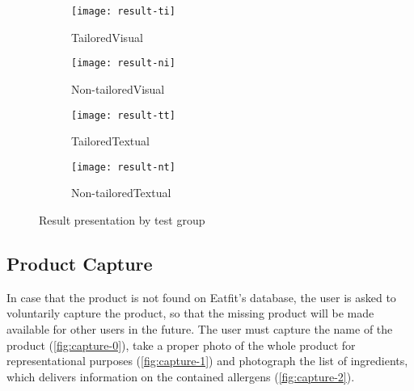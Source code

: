 \begin{figure}[H]
     \centering
     \begin{subfigure}[b]{0.2\textwidth}
         \centering
         \texttt{[image: result-ti]}
         \caption{Tailored\linebreak Visual}
         \label{fig:result-ti}
     \end{subfigure}
          \hfill
     \begin{subfigure}[b]{0.2\textwidth}
         \centering
         \texttt{[image: result-ni]}
         \caption{Non-tailored\linebreak Visual}
         \label{fig:result-ni}
     \end{subfigure}
          \hfill
     \begin{subfigure}[b]{0.2\textwidth}
         \centering
         \texttt{[image: result-tt]}
         \caption{Tailored\linebreak Textual}
         \label{fig:result-tt}
    \end{subfigure}
          \hfill
     \begin{subfigure}[b]{0.2\textwidth}
         \centering
         \texttt{[image: result-nt]}
         \caption{Non-tailored\linebreak Textual}
         \label{fig:result-nt}
     \end{subfigure}
        \caption{Result presentation by test group}
        \label{fig:result}
\end{figure}

\subsection{Product Capture}
\label{sub:capture}

In case that the product is not found on Eatfit's database, the user is asked to voluntarily capture the product, so that the missing product will be made available for other users in the future. The user must capture the name of the product (\cref{fig:capture-0}), take a proper photo of the whole product for representational purposes (\cref{fig:capture-1}) and photograph the list of ingredients, which delivers information on the contained allergens (\cref{fig:capture-2}).

